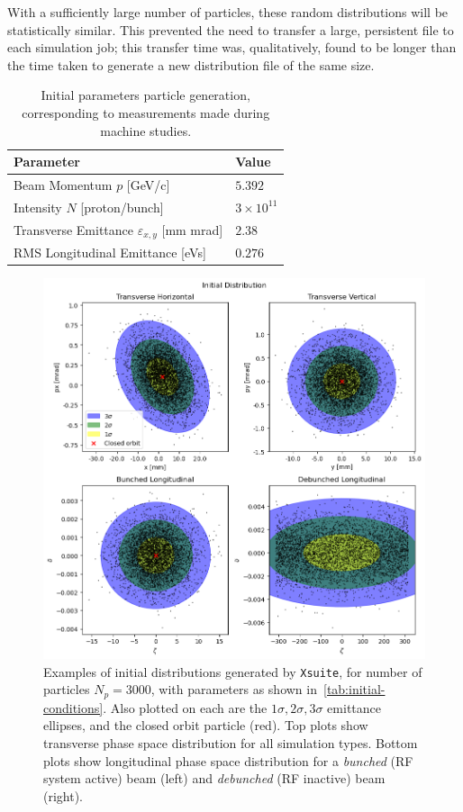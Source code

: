 \documentclass[11pt]{report}
\begin{document}
With a sufficiently large number of particles, these random distributions will be statistically similar. This prevented the need to transfer a large, persistent file to each simulation job; this transfer time was, qualitatively, found to be longer than the time taken to generate a new distribution file of the same size.

\begin{table}[]
  \centering
  \begin{tabular}{ll}
    \centering
  Parameter                                       & Value \\ \hline \hline
  Beam Momentum $p$ [GeV/c]                       & $5.392$ \\
  Intensity $N$ [proton/bunch]                    & $3\times10^{11}$ \\
  Transverse Emittance $\varepsilon_{x,y}$ [mm mrad]  & $2.38$ \\
  RMS Longitudinal Emittance [eVs]                & $0.276$
  \end{tabular}
  \caption{Initial parameters particle generation, corresponding to measurements made during machine studies.}\label{tab:initial-conditions}
\end{table}

\begin{figure}
  \centering
  \includegraphics*[width=\linewidth]{initial-dist.png}
  \cprotect\caption{Examples of initial distributions generated by \verb|Xsuite|, for number of particles $N_p=3000$, with parameters as shown in~\autoref{tab:initial-conditions}. Also plotted on each are the $1\sigma, 2\sigma, 3\sigma$ emittance ellipses, and the closed orbit particle (red). Top plots show transverse phase space distribution for all simulation types. Bottom plots show longitudinal phase space distribution for a \textit{bunched} (RF system active) beam (left) and \textit{debunched} (RF inactive) beam (right).}\label{fig:initial-dist}
\end{figure}
\end{document}
